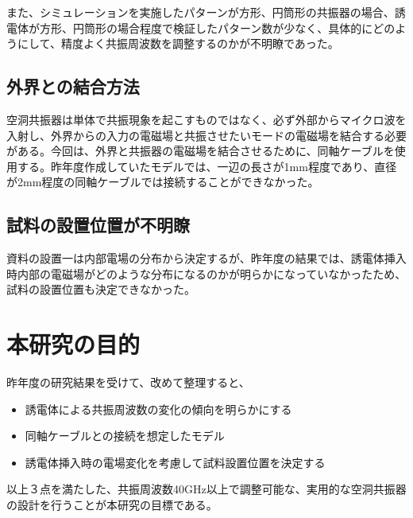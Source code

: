 また、シミュレーションを実施したパターンが方形、円筒形の共振器の場合、誘電体が方形、円筒形の場合程度で検証したパターン数が少なく、具体的にどのようにして、精度よく共振周波数を調整するのかが不明瞭であった。

\subsection{外界との結合方法}
空洞共振器は単体で共振現象を起こすものではなく、必ず外部からマイクロ波を入射し、外界からの入力の電磁場と共振させたいモードの電磁場を結合する必要がある。今回は、外界と共振器の電磁場を結合させるために、同軸ケーブルを使用する。昨年度作成していたモデルでは、一辺の長さが1mm程度であり、直径が2mm程度の同軸ケーブルでは接続することができなかった。

\subsection{試料の設置位置が不明瞭}
資料の設置一は内部電場の分布から決定するが、昨年度の結果では、誘電体挿入時内部の電磁場がどのような分布になるのかが明らかになっていなかったため、試料の設置位置も決定できなかった。

\section{本研究の目的}
昨年度の研究結果を受けて、改めて整理すると、

\begin{itemize}
  \item 誘電体による共振周波数の変化の傾向を明らかにする
  \item 同軸ケーブルとの接続を想定したモデル
  \item 誘電体挿入時の電場変化を考慮して試料設置位置を決定する
\end{itemize}

以上３点を満たした、共振周波数40GHz以上で調整可能な、実用的な空洞共振器の設計を行うことが本研究の目標である。
